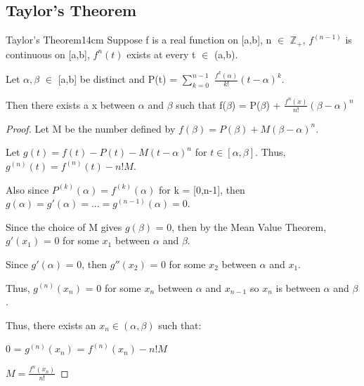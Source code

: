     \newpage





\subsection{ Taylor's Theorem }

    \begin{wtheorem}{Taylor's Theorem}{14cm}
        Suppose f is a real function on [a,b], n $\in$ $\mathbb{Z}_+$,
        $f^{(n-1)}$ is continuous on [a,b], $f^n(t)$ exists at every t $\in$ (a,b).
        
        Let $\alpha,\beta$ $\in$ [a,b] be distinct and
        P(t) = $\sum_{k=0}^{n-1}$ $\frac{f^k(\alpha)}{k!} (t-\alpha)^k$.

        Then there exists a x between $\alpha$ and $\beta$ such that
        f($\beta$) = P($\beta$) + $\frac{f^n(x)}{n!} (\beta-\alpha)^n$        
    \end{wtheorem}

    \begin{proof}
        Let M be the number defined by
        $f(\beta) = P(\beta) + M(\beta - \alpha)^n$.

        Let $g(t) = f(t) - P(t) - M(t- \alpha)^n$ for $t \in [\alpha,\beta]$.
        Thus, $g^{(n)}(t) = f^{(n)}(t) - n!M$.

        Also since $P^{(k)}(\alpha) = f^{(k)}(\alpha)$ for k = [0,n-1], then
        $g(\alpha) = g'(\alpha) = ... = g^{(n-1)}(\alpha) = 0$.

        Since the choice of M gives $g(\beta)$ = 0, then by the Mean Value Theorem,
        $g'(x_1)$ = 0 for some $x_1$ between $\alpha$ and $\beta$.

        Since $g'(\alpha)$ = 0, then $g''(x_2)$ = 0
        for some $x_2$ between $\alpha$ and $x_1$.

        Thus, $g^{(n)}(x_n)$ = 0 for some $x_n$ between $\alpha$ and $x_{n-1}$
        so $x_n$ is between $\alpha$ and $\beta$.

        Thus, there exists an $x_n \in (\alpha,\beta)$ such that:

        \hspace{1cm}
        0 = $g^{(n)}(x_n)$ = $f^{(n)}(x_n) - n!M$

        \hspace{1cm}
        $M = \frac{f^{n}(x_n)}{n!}$
    \end{proof}

    \vspace{0.5cm}





